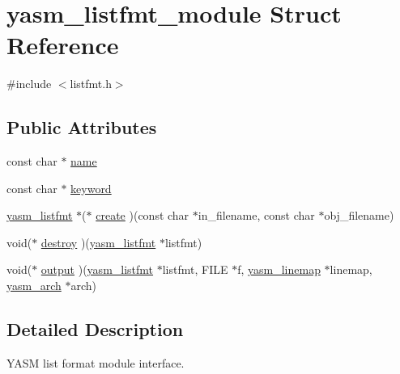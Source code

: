 \hypertarget{structyasm__listfmt__module}{\section{yasm\-\_\-listfmt\-\_\-module Struct Reference}
\label{structyasm__listfmt__module}
}


{\ttfamily \#include $<$listfmt.\-h$>$}

\subsection*{Public Attributes}
\begin{DoxyCompactItemize}
\item 
const char $\ast$ \hyperlink{structyasm__listfmt__module_a0817d3519e1ac91a1bad94b28a7edadd}{name}
\item 
const char $\ast$ \hyperlink{structyasm__listfmt__module_a3ce0f3e953d23dce48ed848a910385cf}{keyword}
\item 
\hyperlink{coretype_8h_ae7dd230a0e386f070ca54f9d270eae26}{yasm\-\_\-listfmt} $\ast$($\ast$ \hyperlink{structyasm__listfmt__module_a8625c26e2d4c39e71383f57fda39c0b8}{create} )(const char $\ast$in\-\_\-filename, const char $\ast$obj\-\_\-filename)
\item 
void($\ast$ \hyperlink{structyasm__listfmt__module_a75c3694c69440c85582d0100d198fee7}{destroy} )(\hyperlink{coretype_8h_ae7dd230a0e386f070ca54f9d270eae26}{yasm\-\_\-listfmt} $\ast$listfmt)
\item 
void($\ast$ \hyperlink{structyasm__listfmt__module_a5d3da5cb63cf141bc06c8db40e2d4876}{output} )(\hyperlink{coretype_8h_ae7dd230a0e386f070ca54f9d270eae26}{yasm\-\_\-listfmt} $\ast$listfmt, F\-I\-L\-E $\ast$f, \hyperlink{structyasm__linemap}{yasm\-\_\-linemap} $\ast$linemap, \hyperlink{coretype_8h_a8e0de61d73c940f0e7b6ef12e0dc1c70}{yasm\-\_\-arch} $\ast$arch)
\end{DoxyCompactItemize}


\subsection{Detailed Description}
Y\-A\-S\-M list format module interface. 

